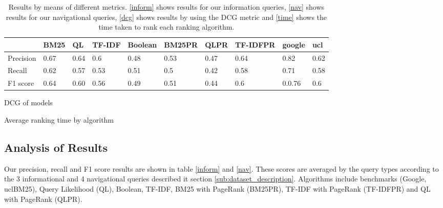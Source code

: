 \begin{table*}[!t]
\begin{subtable}{.5\textwidth}
    \label{nav}
    \resizebox{\columnwidth}{!}
    {
      \begin{tabular}{|l|l|l|l|l|l|l|l|l|l|}
      \hline
                & BM25  & QL & TF-IDF &Boolean& BM25PR &QLPR&TF-IDFPR &google&ucl \\ \hline
      Precision & 0.67& 0.64& 0.6 &0.48& 0.53 & 0.47 & 0.64&0.82&0.62 \\ \hline
      Recall    & 0.62& 0.57& 0.53& 0.51&0.5& 0.42& 0.58 &0.71&0.58\\ \hline
      F1 score  & 0.64& 0.60& 0.56& 0.49& 0.51&0.44 & 0.6&0.0.76&0.6\\ \hline
      \end{tabular}
    }
    \end{subtable}
    \begin{subtable}{.5\textwidth}
    \centering
    \caption{DCG of models}
    \label{dcg}
    \end{subtable}%
    \begin{subtable}{.5\textwidth}
    \centering
    \caption{Average ranking time by algorithm}
    \end{subtable}
    \caption{Results by means of different metrics. \ref{inform} shows results for our information queries, \ref{nav} shows results for our navigational queries, \ref{dcg} shows results by using the DCG metric and \ref{time} shows the time taken to rank each ranking algorithm.}
    \label{fig:results}
\end{table*}

\subsection{Analysis of Results} %
\label{sub:analysis_of_results}
Our precision, recall and F1 score results are shown in table \ref{inform} and \ref{nav}. These scores are averaged by the query types according to the 3 informational and 4 navigational queries described it section \ref{sub:dataset_description}. Algorithms include benchmarks (Google, uclBM25), Query Likelihood (QL), Boolean, TF-IDF, BM25 with PageRank (BM25PR), TF-IDF with PageRank (TF-IDFPR) and QL with PageRank (QLPR).


